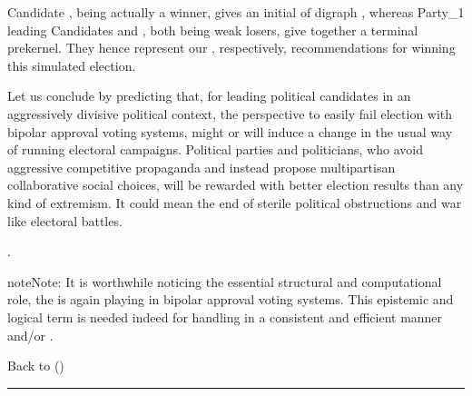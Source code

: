 \documentclass[a4paper,12pt,english]{sphinxhowto}
\begin{document}
\sphinxAtStartPar
Candidate , being actually a  winner, gives an initial  of digraph , whereas Party\_1 leading Candidates  and , both being weak  losers, give together a terminal  prekernel. They hence represent our , respectively,  recommendations for winning this simulated election.

\sphinxAtStartPar
Let us conclude by predicting that, for leading political candidates in an aggressively divisive political context, the perspective to easily fail election with bipolar approval voting systems, might or will induce a change in the usual way of running electoral campaigns. Political parties and politicians, who avoid aggressive competitive propaganda and instead propose multipartisan collaborative social choices, will be rewarded with better election results than any kind of extremism. It could mean the end of sterile political obstructions and war like electoral battles.

\sphinxAtStartPar
{}.

\begin{sphinxadmonition}{note}{Note:}
\sphinxAtStartPar
It is worthwhile noticing the essential structural and computational role, the  is again playing in bipolar approval voting systems. This epistemic and logical  term is needed indeed for handling in a consistent and efficient manner  and/or .
\end{sphinxadmonition}

\sphinxAtStartPar
Back to {\hyperref[\detokenize{pearls:pearls-label}]{}} ()


\bigskip\hrule\bigskip
\end{document}
